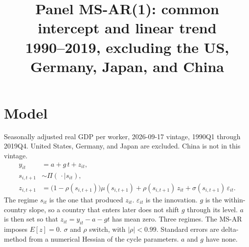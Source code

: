 \documentclass[11pt]{article}
\title{Panel MS-AR(1): common intercept and linear trend\\[0.4em]\large 1990--2019, excluding the US, Germany, Japan, and China}
\author{}
\date{}
\begin{document}
\maketitle
\section{Model}
Seasonally adjusted real GDP per worker, 2026-09-17 vintage, 1990Q1 through 2019Q4. United States, Germany, and Japan are excluded. China is not in this vintage.
\begin{align}
y_{it} &= a + g\, t + z_{it}, \\
s_{i,t+1} &\sim \Pi(\,\cdot\mid s_{it}), \\
z_{i,t+1} &= \bigl(1-\rho(s_{i,t+1})\bigr)\mu(s_{i,t+1}) + \rho(s_{i,t+1})\, z_{it} + \sigma(s_{i,t+1})\,\varepsilon_{it}.
\end{align}
The regime $s_{it}$ is the one that produced $z_{it}$. $\varepsilon_{it}$ is the innovation. $g$ is the within-country slope, so a country that enters later does not shift $g$ through its level. $a$ is then set so that $z_{it}=y_{it}-a-gt$ has mean zero. Three regimes. The MS-AR imposes $E[z]=0$. $\sigma$ and $\rho$ switch, with $|\rho|<0.99$. Standard errors are delta-method from a numerical Hessian of the cycle parameters. $a$ and $g$ have none.
\clearpage
\end{document}

